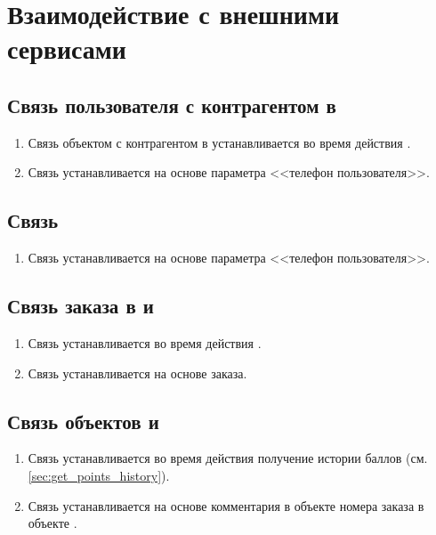 \chapter{Взаимодействие с внешними сервисами}

    \section{Связь пользователя с контрагентом в }
        \begin{enumerate}
            \item Связь объектом  с контрагентом в  устанавливается во время действия .
            \item Связь устанавливается на основе параметра <<телефон пользователя>>.
        \end{enumerate}

    \section{Связь  }
        \begin{enumerate}
            \item Связь устанавливается на основе параметра <<телефон пользователя>>.
        \end{enumerate}

    \section{Связь заказа в  и }
        \begin{enumerate}
            \item Связь устанавливается во время действия .
            \item Связь устанавливается на основе  заказа.
        \end{enumerate}
    
    \section{Связь объектов  и }
        \begin{enumerate}
            \item Связь устанавливается во время действия получение истории баллов (см. \ref{sec:get_points_history}).
            \item Связь устанавливается на основе комментария в объекте  номера заказа в объекте .
        \end{enumerate}
    
